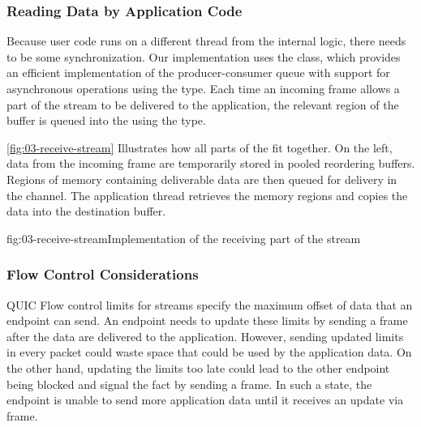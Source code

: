 \subsubsection{Reading Data by Application Code}

Because user code runs on a different thread from the internal \QuicConnection{} logic, there needs
to be some synchronization. Our implementation uses the \ChannelOf{} class, which provides an
efficient implementation of the producer-consumer queue with support for asynchronous operations
using the \ValueTaskOf{} type. Each time an incoming \STREAM{} frame allows a part of the
stream to be delivered to the application, the relevant region of the buffer is queued into the
\ChannelOf{} using the \MemoryOf{\Byte{}} type.





\autoref{fig:03-receive-stream} Illustrates how all parts of the \ReceiveStream{} fit together. On
the left, data from the incoming \STREAM{} frame are temporarily stored in pooled reordering
buffers. Regions of memory containing deliverable data are then queued for delivery in the channel.
The application thread retrieves the memory regions and copies the data into the destination buffer.

\begin{myFigure}{fig:03-receive-stream}{Implementation of the receiving part of the stream}

  \resizebox{\linewidth}{!}{}

\end{myFigure}

\subsubsection{Flow Control Considerations}

QUIC Flow control limits for streams specify the maximum offset of data that an endpoint can send.
An endpoint needs to update these limits by sending a \MAXSTREAMDATA{} frame after the data are
delivered to the application. However, sending updated limits in every packet could waste space that
could be used by the application data. On the other hand, updating the limits too late could lead to
the other endpoint being blocked and signal the fact by sending a \STREAMDATABLOCKED{} frame. In
such a state, the endpoint is unable to send more application data until it receives an update via
\MAXSTREAMDATA{} frame.

